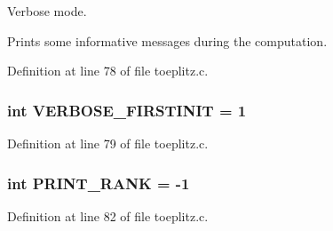Verbose mode. 

Prints some informative messages during the computation. 

Definition at line 78 of file toeplitz.\-c.

\subsubsection[{V\-E\-R\-B\-O\-S\-E\-\_\-\-F\-I\-R\-S\-T\-I\-N\-I\-T}]{\setlength{\rightskip}{0pt plus 5cm}int V\-E\-R\-B\-O\-S\-E\-\_\-\-F\-I\-R\-S\-T\-I\-N\-I\-T = 1}\label{toeplitz_8c_a005f790383498397d0fdad1513881e3f}


Definition at line 79 of file toeplitz.\-c.

\subsubsection[{P\-R\-I\-N\-T\-\_\-\-R\-A\-N\-K}]{\setlength{\rightskip}{0pt plus 5cm}int P\-R\-I\-N\-T\-\_\-\-R\-A\-N\-K = -\/1}\label{toeplitz_8c_a300d52d9923297872ffb24962a0f0ce6}


Definition at line 82 of file toeplitz.\-c.

